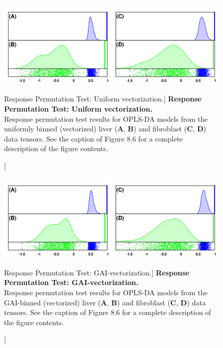 \begin{figure}[ht!]
\includegraphics[width=6.5in]{figs/gaibin/08-perm-unif-vec.png}
\caption
      [Response Permutation Test: Uniform vectorization.]{
  {\bf Response Permutation Test: Uniform vectorization.}
  \\
  Response permutation test results for OPLS-DA models from the uniformly
  binned (vectorized) liver ({\bf A}, {\bf B}) and fibroblast
  ({\bf C}, {\bf D}) data tensors. See the caption of Figure 8.6 for a
  complete description of the figure contents.
}
\label{figure.8.8}
\end{figure}

\begin{figure}[ht!]
\includegraphics[width=6.5in]{figs/gaibin/09-perm-gai-vec.png}
\caption
      [Response Permutation Test: GAI-vectorization.]{
  {\bf Response Permutation Test: GAI-vectorization.}
  \\
  Response permutation test results for OPLS-DA models from the GAI-binned
  (vectorized) liver ({\bf A}, {\bf B}) and fibroblast
  ({\bf C}, {\bf D}) data tensors. See the caption of Figure 8.6 for a
  complete description of the figure contents.
}
\label{figure.8.9}
\end{figure}

\pagebreak



